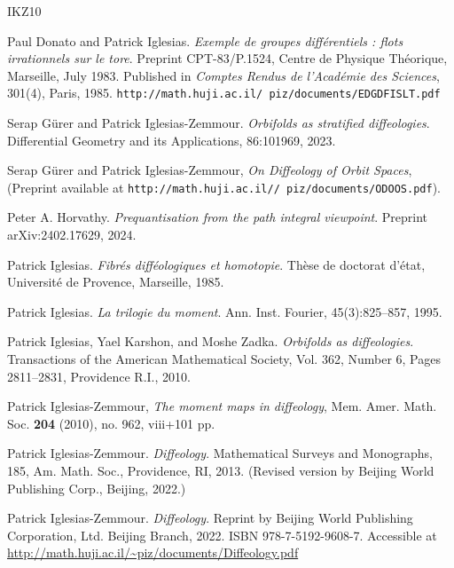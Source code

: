   \begin{thebibliography}{IKZ10} %
    
    Paul Donato and Patrick Iglesias.
    {\em Exemple de groupes diff\'erentiels : flots irrationnels sur le tore}.
    Preprint CPT-83/P.1524, Centre de Physique Th\'eorique, Marseille, July 1983. Published in {\em Comptes Rendus de l'Acad\'emie des Sciences}, 301(4), Paris, 1985.
    \texttt{http://math.huji.ac.il/~piz/documents/EDGDFISLT.pdf}
    
    Serap G{\"u}rer and Patrick Iglesias-Zemmour.
    {\em Orbifolds as stratified diffeologies}.
    {Differential Geometry and its Applications}, 86:101969, 2023.
    
    Serap Gürer and Patrick Iglesias-Zemmour,
    \emph{On Diffeology of Orbit Spaces},
    (Preprint available at \texttt{http://math.huji.ac.il//~piz/documents/ODOOS.pdf}).
    
    Peter A. Horvathy.
    {\em Prequantisation from the path integral viewpoint}.
    Preprint arXiv:2402.17629, 2024.
    
    Patrick Iglesias.
    {\em Fibr\'es diff\'eologiques et homotopie}.
    Th\`ese de doctorat d'\'etat, Universit\'e de Provence, Marseille, 1985.
    
    Patrick Iglesias.
    {\em La trilogie du moment}.
    Ann. Inst. Fourier, 45(3):825--857, 1995.
    
    Patrick Iglesias, Yael Karshon, and Moshe Zadka.
    {\em Orbifolds as diffeologies}.
    Transactions of the American Mathematical Society, Vol. 362, Number 6, Pages 2811--2831, Providence R.I., 2010.
    
    Patrick Iglesias-Zemmour,
    \emph{The moment maps in diffeology},
    Mem. Amer. Math. Soc. \textbf{204} (2010), no. 962, viii+101 pp.
    
    Patrick Iglesias-Zemmour.
    {\em Diffeology}.
    Mathematical Surveys and Monographs, 185, Am. Math. Soc., Providence, RI, 2013.
    (Revised version by Beijing World Publishing Corp., Beijing, 2022.)
    
    Patrick Iglesias-Zemmour.
    {\em Diffeology}.
    Reprint by Beijing World Publishing Corporation, Ltd. Beijing Branch, 2022. ISBN 978-7-5192-9608-7.
    Accessible at \\
    \url{http://math.huji.ac.il/~piz/documents/Diffeology.pdf}
    

\end{thebibliography}
